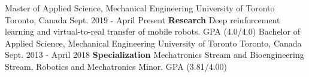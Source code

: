 \begin{cventries}
  \cventry
    {Master of Applied Science, Mechanical Engineering}
    {University of Toronto}
    {Toronto, Canada}
    {Sept. 2019 - April Present}
    {\textbf{Research} Deep reinforcement learning and virtual-to-real transfer of mobile robots. GPA (4.0/4.0)}
  \cventry
    {Bachelor of Applied Science, Mechanical Engineering}
    {University of Toronto}
    {Toronto, Canada}
    {Sept. 2013 - April 2018}
    {\textbf{Specialization} Mechatronics Stream and Bioengineering Stream, Robotics and Mechatronics Minor. GPA (3.81/4.00)}
\end{cventries}
